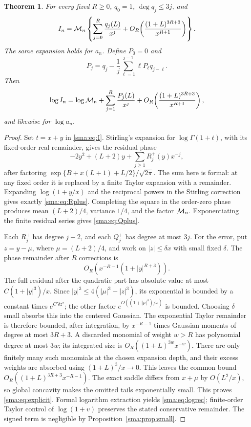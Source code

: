\documentclass[11pt,letterpaper]{article}
\numberwithin{equation}{section}
\newtheorem{theorem}{Theorem}[section]\newtheorem{lemma}[theorem]{Lemma}\newtheorem{proposition}[theorem]{Proposition}\newtheorem{corollary}[theorem]{Corollary}\theoremstyle{remark}\newtheorem{remark}[theorem]{Remark}
\begin{document}
\begin{theorem}\label{sma:thm:explicit}
For every fixed $R\ge0$, $q_0=1$, $\deg q_j\le3j$, and
\begin{equation}\label{sma:eq:explicit}
 I_n=\mathcal M_n\left\{\sum_{j=0}^R\frac{q_j(L)}{x^j}
 +O_R\!\left(\frac{(1+L)^{3R+3}}{x^{R+1}}\right)\right\}.
\end{equation}
The same expansion holds for $a_n$. Define $P_0=0$ and
\begin{equation}\label{sma:eq:logrec}
 P_j=q_j-\frac1j\sum_{\ell=1}^{j-1}\ell P_\ell q_{j-\ell}.
\end{equation}
Then
\begin{equation}\label{sma:eq:logfull}
 \log I_n=\log\mathcal M_n+\sum_{j=1}^R\frac{P_j(L)}{x^j}
 +O_R\!\left(\frac{(1+L)^{3R+3}}{x^{R+1}}\right),
\end{equation}
and likewise for $\log a_n$.
\end{theorem}
\begin{proof}
Set $t=x+y$ in \eqref{sma:eq:I}. Stirling's expansion for $\log\Gamma(1+t)$, with its fixed-order real remainder, gives the residual phase
\begin{equation}\label{sma:eq:localplus}
 -2y^2+(L+2)y+\sum_{j\ge1}R_j^+(y)x^{-j},
\end{equation}
after factoring $\exp\{B+x(L+1)+L/2\}/\sqrt{2\pi}$. The sum here is formal: at any fixed order it is replaced by a finite Taylor expansion with a remainder. Expanding $\log(1+y/x)$ and the reciprocal powers in the Stirling correction gives exactly \eqref{sma:eq:Rplus}. Completing the square in the order-zero phase produces mean $(L+2)/4$, variance $1/4$, and the factor $\mathcal M_n$. Exponentiating the finite residual series gives \eqref{sma:eq:Qplus}.

Each $R_j^+$ has degree $j+2$, and each $Q_j^+$ has degree at most $3j$. For the error, put $z=y-\mu$, where $\mu=(L+2)/4$, and work on $|z|\le\delta x$ with small fixed $\delta$. The phase remainder after $R$ corrections is
\[
 O_R\!\left(x^{-R-1}(1+|y|^{R+3})\right).
\]
The full residual after the quadratic part has absolute value at most $C(1+|y|^3)/x$. Since $|y|^3\le4(|\mu|^3+|z|^3)$, its exponential is bounded by a constant times $e^{C'\delta z^2}$; the other factor $e^{O((1+|\mu|^3)/x)}$ is bounded. Choosing $\delta$ small absorbs this into the centered Gaussian. The exponential Taylor remainder is therefore bounded, after integration, by $x^{-R-1}$ times Gaussian moments of degree at most $3R+3$. A discarded monomial of weight $w>R$ has polynomial degree at most $3w$; its integrated size is $O_R((1+L)^{3w}x^{-w})$. There are only finitely many such monomials at the chosen expansion depth, and their excess weights are absorbed using $(1+L)^3/x\to0$. This leaves the common bound $O_R((1+L)^{3R+3}x^{-R-1})$. The exact saddle differs from $x+\mu$ by $O(L^2/x)$, so global concavity makes the omitted tails exponentially small. This proves \eqref{sma:eq:explicit}. Formal logarithm extraction yields \eqref{sma:eq:logrec}; finite-order Taylor control of $\log(1+v)$ preserves the stated conservative remainder. The signed term is negligible by Proposition~\ref{sma:prop:small}.
\end{proof}
\end{document}
